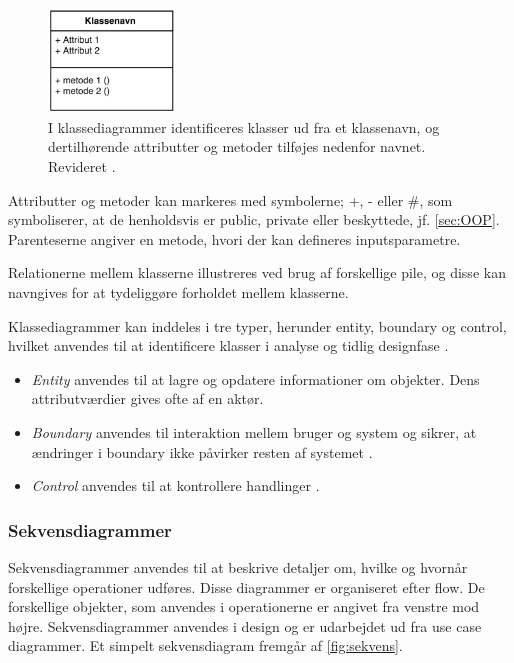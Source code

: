 \begin{figure} [H]
\centering
\includegraphics[width=0.3\textwidth]{figures/klassediag}
\caption{I klassediagrammer identificeres klasser ud fra et klassenavn, og dertilhørende attributter og metoder tilføjes nedenfor navnet. Revideret \cite{Fowler2004}.}
\label{fig:klassediagram}
\end{figure}

\noindent
Attributter og metoder kan markeres med symbolerne; +, - eller \#, som symboliserer, at de henholdsvis er public, private eller beskyttede, jf. \autoref{sec:OOP}. Parenteserne angiver en metode, hvori der kan defineres inputsparametre.

Relationerne mellem klasserne illustreres ved brug af forskellige pile, og disse kan navngives for at tydeliggøre forholdet mellem  klasserne.

Klassediagrammer kan inddeles i tre typer, herunder entity, boundary og control, hvilket anvendes til at identificere klasser i analyse og tidlig designfase \cite{RSC2002}.

\begin{itemize}
\item \textit{Entity} anvendes til at lagre og opdatere informationer om objekter. Dens attributværdier gives ofte af en aktør.\cite{RSC2002}
\item \textit{Boundary} anvendes til interaktion mellem bruger og system og sikrer, at ændringer i boundary ikke påvirker resten af systemet \cite{RSC2002}.
\item \textit{Control} anvendes til at kontrollere handlinger \cite{RSC2002}. 
\end{itemize}

\subsubsection{Sekvensdiagrammer}
Sekvensdiagrammer anvendes til at beskrive detaljer om, hvilke og hvornår forskellige operationer udføres. Disse diagrammer er organiseret efter flow. De forskellige objekter, som anvendes i operationerne er angivet fra venstre mod højre. Sekvensdiagrammer anvendes i design og er udarbejdet ud fra use case diagrammer.\cite{Brahma2015} Et simpelt sekvensdiagram fremgår af \autoref{fig:sekvens}.

